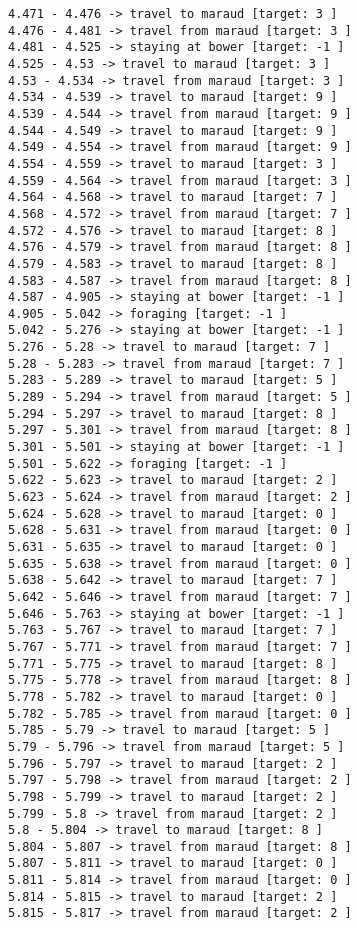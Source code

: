 \documentclass[11pt]{article}
\begin{document}
\begin{Verbatim}[commandchars=\\\{\}]
4.471 - 4.476 -> travel to maraud [target: 3 ]
4.476 - 4.481 -> travel from maraud [target: 3 ]
4.481 - 4.525 -> staying at bower [target: -1 ]
4.525 - 4.53 -> travel to maraud [target: 3 ]
4.53 - 4.534 -> travel from maraud [target: 3 ]
4.534 - 4.539 -> travel to maraud [target: 9 ]
4.539 - 4.544 -> travel from maraud [target: 9 ]
4.544 - 4.549 -> travel to maraud [target: 9 ]
4.549 - 4.554 -> travel from maraud [target: 9 ]
4.554 - 4.559 -> travel to maraud [target: 3 ]
4.559 - 4.564 -> travel from maraud [target: 3 ]
4.564 - 4.568 -> travel to maraud [target: 7 ]
4.568 - 4.572 -> travel from maraud [target: 7 ]
4.572 - 4.576 -> travel to maraud [target: 8 ]
4.576 - 4.579 -> travel from maraud [target: 8 ]
4.579 - 4.583 -> travel to maraud [target: 8 ]
4.583 - 4.587 -> travel from maraud [target: 8 ]
4.587 - 4.905 -> staying at bower [target: -1 ]
4.905 - 5.042 -> foraging [target: -1 ]
5.042 - 5.276 -> staying at bower [target: -1 ]
5.276 - 5.28 -> travel to maraud [target: 7 ]
5.28 - 5.283 -> travel from maraud [target: 7 ]
5.283 - 5.289 -> travel to maraud [target: 5 ]
5.289 - 5.294 -> travel from maraud [target: 5 ]
5.294 - 5.297 -> travel to maraud [target: 8 ]
5.297 - 5.301 -> travel from maraud [target: 8 ]
5.301 - 5.501 -> staying at bower [target: -1 ]
5.501 - 5.622 -> foraging [target: -1 ]
5.622 - 5.623 -> travel to maraud [target: 2 ]
5.623 - 5.624 -> travel from maraud [target: 2 ]
5.624 - 5.628 -> travel to maraud [target: 0 ]
5.628 - 5.631 -> travel from maraud [target: 0 ]
5.631 - 5.635 -> travel to maraud [target: 0 ]
5.635 - 5.638 -> travel from maraud [target: 0 ]
5.638 - 5.642 -> travel to maraud [target: 7 ]
5.642 - 5.646 -> travel from maraud [target: 7 ]
5.646 - 5.763 -> staying at bower [target: -1 ]
5.763 - 5.767 -> travel to maraud [target: 7 ]
5.767 - 5.771 -> travel from maraud [target: 7 ]
5.771 - 5.775 -> travel to maraud [target: 8 ]
5.775 - 5.778 -> travel from maraud [target: 8 ]
5.778 - 5.782 -> travel to maraud [target: 0 ]
5.782 - 5.785 -> travel from maraud [target: 0 ]
5.785 - 5.79 -> travel to maraud [target: 5 ]
5.79 - 5.796 -> travel from maraud [target: 5 ]
5.796 - 5.797 -> travel to maraud [target: 2 ]
5.797 - 5.798 -> travel from maraud [target: 2 ]
5.798 - 5.799 -> travel to maraud [target: 2 ]
5.799 - 5.8 -> travel from maraud [target: 2 ]
5.8 - 5.804 -> travel to maraud [target: 8 ]
5.804 - 5.807 -> travel from maraud [target: 8 ]
5.807 - 5.811 -> travel to maraud [target: 0 ]
5.811 - 5.814 -> travel from maraud [target: 0 ]
5.814 - 5.815 -> travel to maraud [target: 2 ]
5.815 - 5.817 -> travel from maraud [target: 2 ]

\end{Verbatim}
\end{document}
